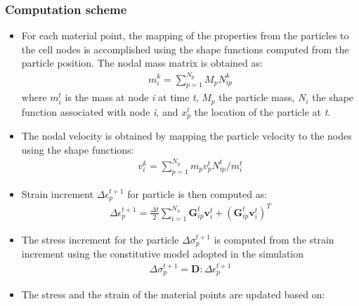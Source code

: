 \subsubsection{Computation scheme}
\begin{itemize}
\item
For each material point, the mapping of the properties from the particles to 
the cell nodes is accomplished using the shape functions computed from the 
particle position. The nodal mass matrix is obtained as:
\begin{align}
\mathit{m}_{\mathit{i}}^{\mathit{k}} = 
\sum\limits_{\mathit{p}=1}^{\mathit{N}_{\mathit{p}}} \mathit{M}_{\mathit{p}} 
\mathit{N}_{\mathit{ip}}^{\mathit{k}} 
\end{align}
where $\mathit{m}_{i}^{t}$ is the mass at node \textit{i} at time \textit{t}, 
$\mathit{M}_{\mathit{p}}$ the particle mass, $\mathit{N}_{\mathit{i}}$ the 
shape function associated with node \textit{i}, and 
$\mathit{x}_{\mathit{p}}^{\mathit{t}}$ the location of the particle at 
\textit{t}.
\item
The nodal velocity is obtained by mapping the particle velocity to the nodes 
using the shape functions:
\begin{align}
\mathbf{\mathit{v}}_{\mathit{i}}^{\mathit{k}} = 
\sum\limits_{\mathit{p}=1}^{\mathit{N}_{\mathit{p}}} \mathit{m}_{\mathit{p}} 
\mathbf{\mathit{v}}_{\mathit{p}}^{\mathit{t}} 
\mathbf{\mathit{N}}_{\mathit{ip}}^{\mathit{t}} / 
\mathit{m}_{\mathit{i}}^{\mathit{t}}
\end{align}
\item
Strain increment $\Delta \epsilon_{p}^{t+1}$ for particle is then computed as:
\begin{align}
\Delta \epsilon_{p}^{t+1} = \frac{\Delta t}{2} 
\sum\limits_{\mathit{i}=1}^{\mathit{N}_{n}}{\mathbf{G}_{\mathit{ip}}^{t} 
\mathbf{v}_{\mathit{i}}^{t} + (\mathbf{G}_{\mathit{ip}}^{t} 
\mathbf{v}_{\mathit{i}}^{t})^{\mathit{T}}}
\end{align}
\item
The stress increment for the particle $\Delta \sigma_{\mathit{p}}^{t+1}$ is 
computed from the strain increment using the constitutive model adopted in the 
simulation
\begin{align}
\Delta \sigma_{\mathit{p}}^{t+1} = \mathbf{D} : \Delta \epsilon_{p}^{t+1}
\end{align}
\item
The stress and the strain of the material points are updated based on:
\begin{align}

\end{align}
\end{itemize}
